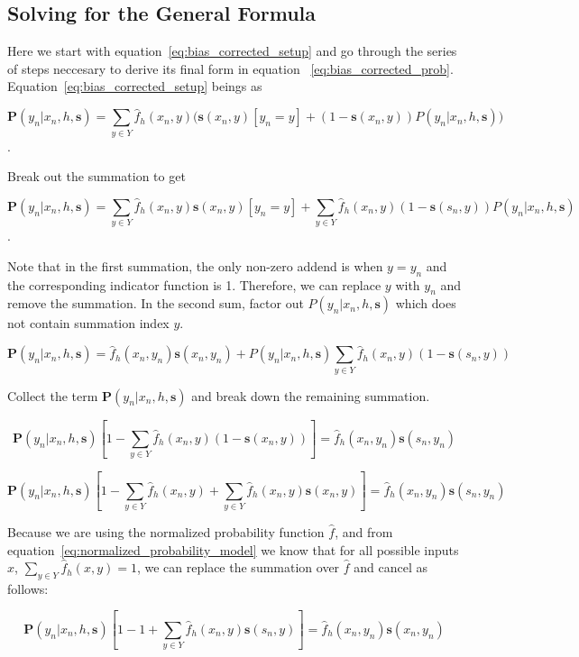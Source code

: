 \documentclass[twoside]{article}
\begin{document}
\begin{appendices}

\section{Solving for the General Formula}
\label{appendix:solving}

Here we start with equation~\eqref{eq:bias_corrected_setup} and go through the series of steps neccesary to derive its final form in equation ~\eqref{eq:bias_corrected_prob}. Equation~\eqref{eq:bias_corrected_setup} beings as

\[\mathbf{P}(y_n|x_n,h,\mathbf{s})=\sum_{y \in Y}\hat{f}_h(x_n,y)\big(\mathbf{s}(x_n,y)\left [y_n = y\right ] + (1-\mathbf{s}(x_n,y))P(y_n|x_n,h,\mathbf{s})\big)\].

Break out the summation to get

\[\mathbf{P}(y_n|x_n,h,\mathbf{s})=\sum_{y \in Y}\hat{f}_h(x_n,y)\mathbf{s}(x_n,y)\left [y_n = y\right ] +\sum_{y \in Y}\hat{f}_h(x_n,y)(1-\mathbf{s}(s_n,y))P(y_n|x_n,h,\mathbf{s})\].

Note that in the first summation, the only non-zero addend is when \(y = y_n\) and the corresponding indicator function is 1. Therefore, we can replace \(y\) with \(y_n\) and remove the summation. In the second sum, factor out \(P(y_n|x_n,h,\mathbf{s})\) which does not contain summation index \(y\).

\[\mathbf{P}(y_n|x_n,h,\mathbf{s})=\hat{f}_h(x_n,y_n)\mathbf{s}(x_n,y_n) +P(y_n|x_n,h,\mathbf{s})\sum_{y \in Y}\hat{f}_h(x_n,y)(1-\mathbf{s}(s_n,y))\]

Collect the term \(\mathbf{P}(y_n|x_n,h,\mathbf{s})\) and break down the remaining summation.

\[\mathbf{P}(y_n|x_n,h,\mathbf{s})\left [ 1 - \sum_{y \in Y}\hat{f}_h(x_n,y)(1-\mathbf{s}(x_n,y)) \right ]=\hat{f}_h(x_n,y_n)\mathbf{s}(s_n,y_n) \]

\[\mathbf{P}(y_n|x_n,h,\mathbf{s})\left [ 1 - \sum_{y \in Y}\hat{f}_h(x_n,y)+\sum_{y \in Y}\hat{f}_h(x_n,y)\mathbf{s}(x_n,y) \right ]=\hat{f}_h(x_n,y_n)\mathbf{s}(s_n,y_n) \]

Because we are using the normalized probability function \(\hat{f}\), and from equation~\eqref{eq:normalized_probability_model} we know that for all possible inputs \(x\), \(\sum_{y \in Y} \hat{f}_h(x, y) = 1\), we can replace the summation over \(\hat{f}\) and cancel as follows:

\[\mathbf{P}(y_n|x_n,h,\mathbf{s})\left [ 1 - 1+\sum_{y \in Y}\hat{f}_h(x_n,y)\mathbf{s}(s_n,y) \right ]=\hat{f}_h(x_n,y_n)\mathbf{s}(x_n,y_n) \]


\end{appendices}
\end{document}
